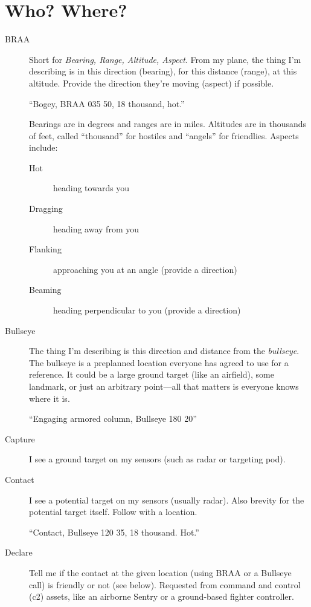\section{Who? Where?}

\begin{description}
\item[BRAA] Short for \emph{Bearing, Range, Altitude, Aspect}.
    From my plane, the thing I'm describing is in this direction
    (bearing), for this distance (range), at this altitude.
    Provide the direction they're moving (aspect) if possible.

    ``Bogey, BRAA 035 50, 18 thousand, hot.''

    Bearings are in degrees and ranges are in miles.
    Altitudes are in thousands of feet, called ``thousand'' for hostiles
    and ``angels'' for friendlies. Aspects include:
    \begin{description}
    \item[Hot] heading towards you
    \item[Dragging] heading away from you
    \item[Flanking] approaching you at an angle (provide a direction)
    \item[Beaming] heading perpendicular to you (provide a direction)
    \end{description}

\item[Bullseye] The thing I'm describing is this direction and distance
    from the \emph{bullseye}.
    The bullseye is a preplanned location everyone has agreed to use for
    a reference. It could be a large ground target (like an airfield),
    some landmark, or just an arbitrary point---all that matters is
    everyone knows where it is.

    ``Engaging armored column, Bullseye 180 20''

\item[Capture] I see a ground target on my sensors (such as radar
    or targeting pod).

\item[Contact] I see a potential target on my sensors (usually radar).
    Also brevity for the potential target itself.
    Follow with a location.

    ``Contact, Bullseye 120 35, 18 thousand. Hot.''

\item[Declare] Tell me if the contact at the given location
    (using BRAA or a Bullseye call) is friendly or not (see below).
    Requested from command and control \ac{(c2)} assets,
    like an airborne  Sentry
    or a ground-based fighter controller.


\end{description}
